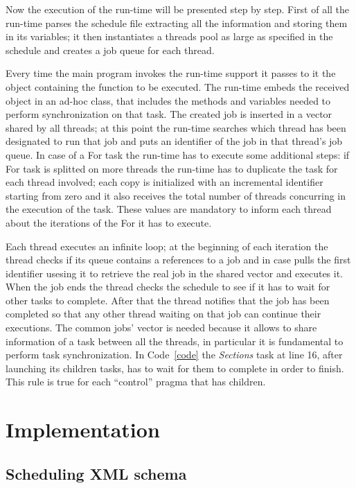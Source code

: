 \documentclass[a4paper,12pt,oneside]{book}
\begin{document}
Now the execution of the run-time will be presented step by step. First of all the run-time parses the schedule file extracting all the information and storing them in its variables; it then instantiates a threads pool as large as specified in the schedule and creates a job queue for each thread. 

Every time the main program invokes the run-time support it passes to it the object containing the function to be executed. The run-time embeds the received object in an ad-hoc class, that includes the methods and variables needed to perform synchronization on that task. The created job is inserted in a vector shared by all threads; at this point the run-time searches which thread has been designated to run that job and puts an identifier of the job in that thread’s job queue. In case of a For task the run-time has to execute some additional steps: if For task is splitted on more threads the run-time has to duplicate the task for each thread involved; each copy is initialized with an incremental identifier starting from zero and it also receives the total number of threads concurring in the execution of the task. These values are mandatory to inform each thread about the iterations of the For it has to execute. 

Each thread executes an infinite loop; at the beginning of each iteration the thread checks if its queue contains a references to a job and in case pulls the first identifier usesing it to retrieve the real job in the shared vector and executes it. When the job ends the thread checks the schedule to see if it has to wait for other tasks to complete. After that the thread notifies that the job has been completed so that any other thread waiting on that job can continue their executions. The common jobs’ vector is needed because it allows to share information of a task between all the threads, in particular it is fundamental to perform task synchronization. In Code~\ref{code} the \emph{Sections} task at line 16, after launching its children tasks, has to wait for them to complete in order to finish. This rule is true for each “control” pragma that has children. 




\chapter{Implementation}
\section{Scheduling XML schema}
\label{schedulexmlschema}
\end{document}
